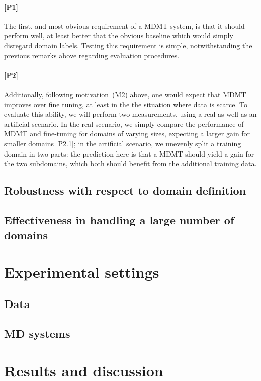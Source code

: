 \documentclass[11pt]{article}
\begin{document}
\paragraph{[P1]} The first, and most obvious requirement of a MDMT system, is that it should perform well, at least better that the obvious baseline which would simply disregard domain labels. Testing this requirement is simple, notwithstanding the previous remarks above regarding evaluation procedures.

\paragraph{[P2]} Additionally, following motivation~(M2) above, one would expect that MDMT improves over fine tuning, at least in the the situation where data is scarce. To evaluate this ability, we will perform two measurements, using a real as well as an artificial scenario. In the real scenario, we simply compare the performance of MDMT and fine-tuning for domains of varying sizes, expecting a larger gain for smaller domains [P2.1]; in the artificial scenario, we unevenly split a training domain in two parts: the prediction here is that a MDMT should yield a gain for the two subdomains, which both should benefit from the additional training data. 

\subsection{Robustness with respect to domain definition \label{ssec:robusness}}

\subsection{Effectiveness in handling a large number of domains \label{ssec:scaling}}

\section{Experimental settings \label{sec:experiments}}
\subsection{Data}
\subsection{MD systems}

\section{Results and discussion \label{sec:results}}
\end{document}
